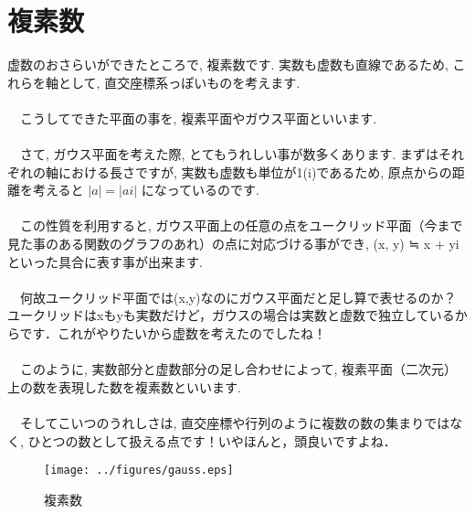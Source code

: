 \documentclass[11pt,a4paper]{ujreport}
\begin{document}
\section{複素数}
虚数のおさらいができたところで, 複素数です. 実数も虚数も直線であるため, これらを軸として, 直交座標系っぽいものを考えます.\\
\\
　こうしてできた平面の事を, 複素平面やガウス平面といいます.\\
\\
　さて, ガウス平面を考えた際, とてもうれしい事が数多くあります. まずはそれぞれの軸における長さですが, 実数も虚数も単位が1(i)であるため, 原点からの距離を考えると $ |a| = |ai| $ になっているのです. \\
\\
　この性質を利用すると, ガウス平面上の任意の点をユークリッド平面（今まで見た事のある関数のグラフのあれ）の点に対応づける事ができ, (x, y) ≒ x + yi といった具合に表す事が出来ます. \\
\\
　何故ユークリッド平面では(x,y)なのにガウス平面だと足し算で表せるのか？ユークリッドはxもyも実数だけど，ガウスの場合は実数と虚数で独立しているからです．これがやりたいから虚数を考えたのでしたね！\\
\\
　このように, 実数部分と虚数部分の足し合わせによって, 複素平面（二次元）上の数を表現した数を複素数といいます.\\
\\
　そしてこいつのうれしさは, 直交座標や行列のように複数の数の集まりではなく, ひとつの数として扱える点です！いやほんと，頭良いですよね．\\

\begin{figure}[H]
\label{im:imagine}
  \centering
  \texttt{[image: ../figures/gauss.eps]}
  \caption{複素数}
\end{figure}
\end{document}
